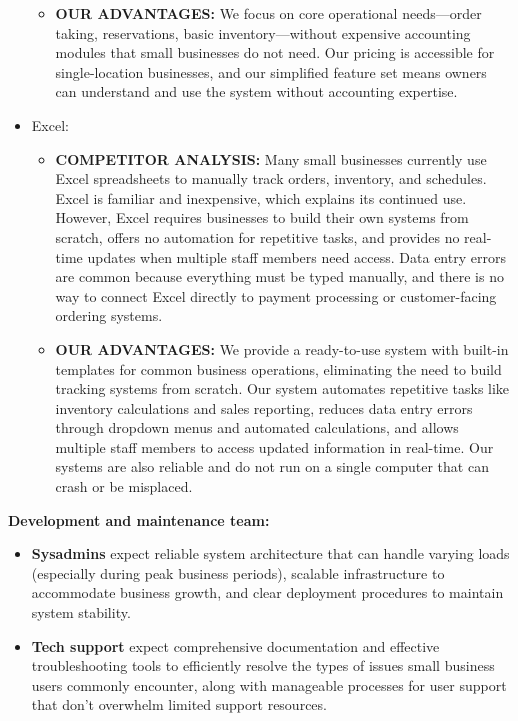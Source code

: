 \documentclass[]{VUMIFTemplateClass}
\begin{document}
\begin{itemize}
\begin{itemize}
        \item \textbf{OUR ADVANTAGES:} 
        We focus on core operational needs—order taking,
        reservations, basic inventory—without expensive accounting modules that
        small businesses do not need. Our pricing is accessible for single-location
        businesses, and our simplified feature set means owners can understand and
        use the system without accounting expertise.
    \end{itemize}
    

    \item Excel: 
    
    \begin{itemize}
        \item \textbf{COMPETITOR ANALYSIS:}
        Many small businesses currently use Excel spreadsheets
        to manually track orders, inventory, and schedules. Excel is familiar and
        inexpensive, which explains its continued use. However, Excel requires
        businesses to build their own systems from scratch, offers no automation for
        repetitive tasks, and provides no real-time updates when multiple staff
        members need access. Data entry errors are common because everything must be
        typed manually, and there is no way to connect Excel directly to payment
        processing or customer-facing ordering systems.
        
        \item \textbf{OUR ADVANTAGES:} 
        We provide a ready-to-use system with built-in
        templates for common business operations, eliminating the need to build
        tracking systems from scratch. Our system automates repetitive tasks like
        inventory calculations and sales reporting, reduces data entry errors
        through dropdown menus and automated calculations, and allows multiple staff
        members to access updated information in real-time. Our systems are also reliable and do not run on a single
        computer that can crash or be misplaced.
        \end{itemize}
        
\end{itemize}

\textbf{Development and maintenance team:}
\begin{itemize}
    \item \textbf{Sysadmins} expect reliable system architecture that can handle
    varying loads (especially during peak business periods), scalable
    infrastructure to accommodate business growth, and clear deployment
    procedures to maintain system stability.
    \item \textbf{Tech support} expect comprehensive documentation and effective
    troubleshooting tools to efficiently resolve the types of issues small
    business users commonly encounter, along with manageable processes for user
    support that don't overwhelm limited support resources.
\end{itemize}
\end{document}
